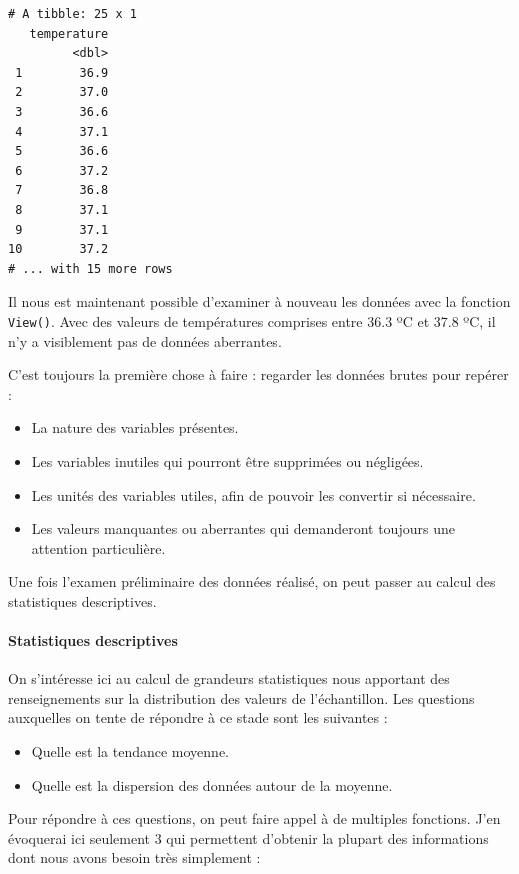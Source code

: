 \documentclass[a4paperpaper,]{article}
\providecommand{\tightlist}{%
  \setlength{\itemsep}{0pt}\setlength{\parskip}{0pt}}
\let\oldparagraph\paragraph
\renewcommand{\paragraph}[1]{\oldparagraph{#1}\mbox{}}
\begin{document}
\begin{verbatim}
# A tibble: 25 x 1
   temperature
         <dbl>
 1        36.9
 2        37.0
 3        36.6
 4        37.1
 5        36.6
 6        37.2
 7        36.8
 8        37.1
 9        37.1
10        37.2
# ... with 15 more rows
\end{verbatim}

Il nous est maintenant possible d'examiner à nouveau les données avec la fonction \texttt{View()}. Avec des valeurs de températures comprises entre 36.3 ºC et 37.8 ºC, il n'y a visiblement pas de données aberrantes.

C'est toujours la première chose à faire : regarder les données brutes pour repérer :

\begin{itemize}
\tightlist
\item
  La nature des variables présentes.
\item
  Les variables inutiles qui pourront être supprimées ou négligées.
\item
  Les unités des variables utiles, afin de pouvoir les convertir si nécessaire.
\item
  Les valeurs manquantes ou aberrantes qui demanderont toujours une attention particulière.
\end{itemize}

Une fois l'examen préliminaire des données réalisé, on peut passer au calcul des statistiques descriptives.

\hypertarget{statistiques-descriptives}{%
\paragraph{Statistiques descriptives}\label{statistiques-descriptives}}

On s'intéresse ici au calcul de grandeurs statistiques nous apportant des renseignements sur la distribution des valeurs de l'échantillon. Les questions auxquelles on tente de répondre à ce stade sont les suivantes :

\begin{itemize}
\tightlist
\item
  Quelle est la tendance moyenne.
\item
  Quelle est la dispersion des données autour de la moyenne.
\end{itemize}

Pour répondre à ces questions, on peut faire appel à de multiples fonctions. J'en évoquerai ici seulement 3 qui permettent d'obtenir la plupart des informations dont nous avons besoin très simplement :
\end{document}
